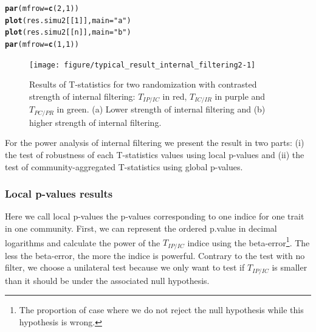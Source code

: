 \documentclass[12pt]{article}\usepackage[]{graphicx}\usepackage[]{color}
\makeatletter
\newcommand{\hlnum}[1]{\textcolor[rgb]{0.686,0.059,0.569}{#1}}%
\newcommand{\hlstr}[1]{\textcolor[rgb]{0.192,0.494,0.8}{#1}}%
\newcommand{\hlstd}[1]{\textcolor[rgb]{0.345,0.345,0.345}{#1}}%
\newcommand{\hlkwc}[1]{\textcolor[rgb]{0.333,0.667,0.333}{#1}}%
\newcommand{\hlkwd}[1]{\textcolor[rgb]{0.737,0.353,0.396}{\textbf{#1}}}%
\newenvironment{kframe}{%
 \def\at@end@of@kframe{}%
 \ifinner\ifhmode%
  \def\at@end@of@kframe{\end{minipage}}%
  \begin{minipage}{\columnwidth}%
 \fi\fi%
 \def\FrameCommand##1{\hskip\@totalleftmargin \hskip-\fboxsep
 \colorbox{shadecolor}{##1}\hskip-\fboxsep
     \hskip-\linewidth \hskip-\@totalleftmargin \hskip\columnwidth}%
 \MakeFramed {\advance\hsize-\width
   \@totalleftmargin\z@ \linewidth\hsize
   \@setminipage}}%
 {\par\unskip\endMakeFramed%
 \at@end@of@kframe}
\newenvironment{knitrout}{}{} %
\makeatother
\begin{document}
\begin{knitrout}\small
{}\color{fgcolor}\begin{kframe}
\begin{alltt}
\hlkwd{par}\hlstd{(}\hlkwc{mfrow}\hlstd{=}\hlkwd{c}\hlstd{(}\hlnum{2}\hlstd{,} \hlnum{1}\hlstd{))}
\hlkwd{plot}\hlstd{(res.simu2[[}\hlnum{1}\hlstd{]],} \hlkwc{main}\hlstd{=}\hlstr{"a"}\hlstd{)}
\hlkwd{plot}\hlstd{(res.simu2[[n]],} \hlkwc{main}\hlstd{=}\hlstr{"b"}\hlstd{)}
\hlkwd{par}\hlstd{(}\hlkwc{mfrow}\hlstd{=}\hlkwd{c}\hlstd{(}\hlnum{1}\hlstd{,} \hlnum{1}\hlstd{))}
\end{alltt}
\end{kframe}\begin{figure}

{\centering \texttt{[image: figure/typical\_result\_internal\_filtering2-1]} 

}

\caption[Results of T-statistics for two randomization with contrasted strength of internal filtering]{Results of T-statistics for two randomization with contrasted strength of internal filtering: $T_{IP/IC}$ in red, $T_{IC/IR}$ in purple and $T_{PC/PR}$ in green. (a) Lower strength of internal filtering and (b) higher strength of internal filtering.\label{fig:typical_result_internal_filtering2}}
\end{figure}


\end{knitrout}

For the power analysis of internal filtering we present the result in two parts: (i) the test of robustness of each T-statistics values using local p-values and (ii) the test of community-aggregated T-statistics using global p-values.

 \subsubsection {Local p-values results}

Here we call local p-values the p-values corresponding to one indice for one trait in one community. First, we can represent the ordered p.value in decimal logarithms and calculate the power of the $T_{IP/IC}$ indice using the beta-error\footnote{The proportion of case where we do not reject the null hypothesis while this hypothesis is wrong.}. The less the beta-error, the more the indice is powerful. Contrary to the test with no filter, we choose a unilateral test because we only want to test if $T_{IP/IC}$ is smaller than it should be under the associated null hypothesis.
\end{document}
